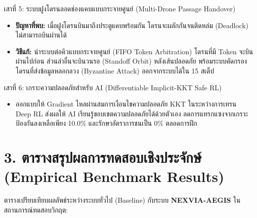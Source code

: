 \documentclass[10pt,a4paper]{article}
\begin{document}
\vspace{4pt}
\begin{infobox}{เสาที่ 5: ระบบฝูงโดรนลอดช่องแคบแบบกระจายศูนย์ (Multi-Drone Passage Handover)}
\begin{itemize}[leftmargin=14pt, itemsep=2pt]
  \item \textbf{ปัญหาที่พบ:} เมื่อฝูงโดรนบินมาถึงประตูแคบพร้อมกัน โดรนจะผลักกันจนติดหล่ม (Deadlock) ไม่สามารถบินผ่านได้
  \item \textbf{วิธีแก้:} นำระบบต่อคิวแบบกระจายศูนย์ (FIFO Token Arbitration) โดรนที่มี Token จะบินผ่านไปก่อน ส่วนลำอื่นจะบินวนรอ (Standoff Orbit) หลังเส้นปลอดภัย พร้อมระบบคัดกรองโดรนที่ส่งข้อมูลหลอกลวง (Byzantine Attack) ออกจากระบบได้ใน 15 สเต็ป
\end{itemize}
\end{infobox}

\vspace{4pt}
\begin{infobox}{เสาที่ 6: เกราะความปลอดภัยสำหรับ AI (Differentiable Implicit-KKT Safe RL)}
\begin{itemize}[leftmargin=14pt, itemsep=2pt]
  \item ออกแบบให้ Gradient ไหลผ่านสมการเงื่อนไขความปลอดภัย KKT ในระหว่างการเทรน Deep RL ส่งผลให้ AI เรียนรู้ขอบเขตความปลอดภัยได้ด้วยตัวเอง ลดการแทรกแซงจากเกราะป้องกันลงเหลือเพียง 10.0\% และรักษาอัตราการชนเป็น 0\% ตลอดการฝึก
\end{itemize}
\end{infobox}

\newpage

\section*{\textcolor{primary}{3. ตารางสรุปผลการทดสอบเชิงประจักษ์ (Empirical Benchmark Results)}}

ตารางเปรียบเทียบผลลัพธ์ระหว่างระบบทั่วไป (Baseline) กับระบบ \textbf{NEXVIA-AEGIS} ในสถานการณ์ทดสอบวิกฤต:
\end{document}
